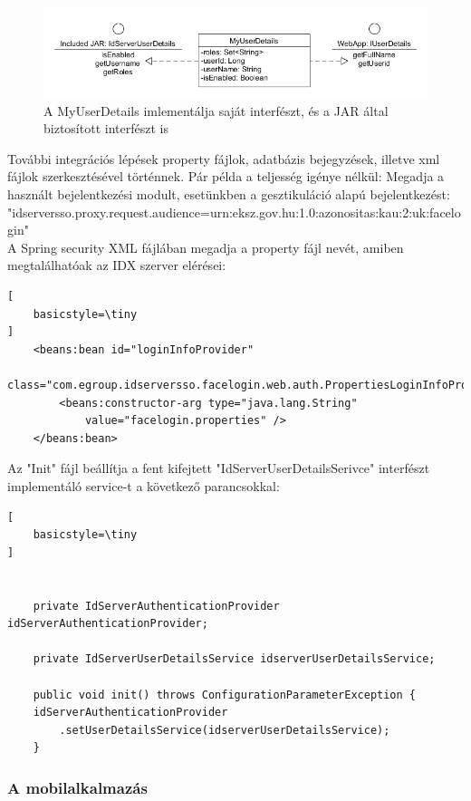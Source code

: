 \begin{figure}[h]
 \begin{minipage}{1\textwidth} 
    \includegraphics[scale=0.6]{img/userdetails}
    \caption{A MyUserDetails imlementálja saját interfészt, és a JAR által biztosított interfészt is}
 \end{minipage}
\end{figure}

\newpage
További integrációs lépések property fájlok, adatbázis bejegyzések, illetve xml fájlok szerkesztésével történnek. Pár példa a teljesség igénye nélkül:
Megadja a használt bejelentkezési modult, esetünkben a gesztikuláció alapú bejelentkezést: \\
"idserversso.proxy.request.audience=urn:eksz.gov.hu:1.0:azonositas:kau:2:uk:facelogin"
\\
A Spring security XML fájlában megadja a property fájl nevét, amiben megtalálhatóak az IDX szerver elérései:
\begin{lstlisting}[
    basicstyle=\tiny
]
	<beans:bean id="loginInfoProvider"
		class="com.egroup.idserversso.facelogin.web.auth.PropertiesLoginInfoProvider">
		<beans:constructor-arg type="java.lang.String"
			value="facelogin.properties" />
	</beans:bean>

\end{lstlisting}

Az "Init" fájl beállítja a fent kifejtett "IdServerUserDetailsSerivce" interfészt implementáló service-t a következő parancsokkal:
\begin{lstlisting}[
    basicstyle=\tiny
]
	

    private IdServerAuthenticationProvider idServerAuthenticationProvider;

    private IdServerUserDetailsService idserverUserDetailsService;

    public void init() throws ConfigurationParameterException {
	idServerAuthenticationProvider
		.setUserDetailsService(idserverUserDetailsService);
    }

\end{lstlisting}

\subsubsection{A mobilalkalmazás}

